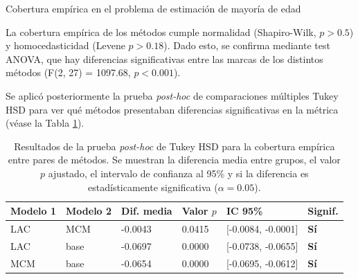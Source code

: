 \begin{StatisticsRef}{Cobertura empírica en el problema de estimación de mayoría de edad}

    La cobertura empírica de los métodos cumple normalidad (Shapiro-Wilk, $p > 0.5$) y homocedasticidad (Levene $p > 0.18$). Dado esto, se confirma mediante test ANOVA, que hay diferencias significativas entre las marcas de los distintos métodos (F(2, 27) = 1097.68, $p < 0.001$).

    Se aplicó posteriormente la prueba \textit{post-hoc} de comparaciones múltiples Tukey HSD para ver qué métodos presentaban diferencias significativas en la métrica (véase la Tabla \ref{tab:AMM_tukey_EC}).

    \renewcommand{\arraystretch}{1.2}
    \begin{table}[H]
        \small
        \centering
        \begin{tabular}{llllll}
        \toprule
        \textbf{Modelo 1} & \textbf{Modelo 2} & \textbf{Dif. media} & \textbf{Valor $p$} & \textbf{IC 95\%} & \textbf{Signif.} \\ \hline
        LAC & MCM & -0.0043 & 0.0415 & [-0.0084, -0.0001] & \textbf{Sí} \\
        LAC & base & -0.0697 & 0.0000 & [-0.0738, -0.0655] & \textbf{Sí} \\
        MCM & base & -0.0654 & 0.0000 & [-0.0695, -0.0612] & \textbf{Sí} \\
        \bottomrule
        \end{tabular}
        \caption[
            Problema de estimación de mayoría de edad: 
            Resultados de la prueba \textit{post-hoc} de Tukey HSD para la cobertura empírica entre pares de métodos.
        ]{
            Resultados de la prueba \textit{post-hoc} de Tukey HSD para la cobertura empírica entre pares de métodos.
            Se muestran la diferencia media entre grupos, el valor $p$ ajustado, el intervalo de confianza al 95\% y si la diferencia es estadísticamente significativa ($\alpha = 0.05$).
        }
        \label{tab:AMM_tukey_EC}
    \end{table}
\end{StatisticsRef}


\FloatBarrier



